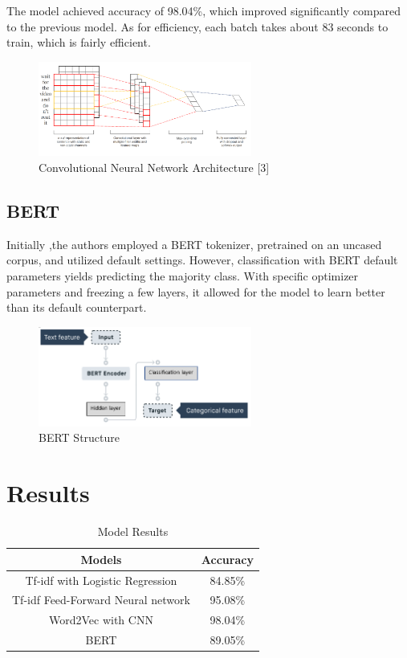 \documentclass[conference]{IEEEtran}
\begin{document}
The model achieved accuracy of 98.04\%, which improved significantly compared to the previous model. As for efficiency, each batch takes about 83 seconds to train, which is fairly efficient.

\begin{figure}[htbp]
\centerline{\includegraphics[width=70mm]{fig2.png}}
\caption{Convolutional Neural Network Architecture [3]}
\label{fig}
\end{figure}

\subsection{BERT}

Initially ,the authors employed a BERT tokenizer, pretrained on an uncased corpus, and utilized default settings. However, classification with BERT default parameters yields predicting the majority class. With specific optimizer parameters and freezing a few layers, it allowed for the model to learn better than its default counterpart.

\begin{figure}[htbp]
\centerline{\includegraphics[width=70mm]{fig3.png}}
\caption{BERT Structure}
\label{fig}
\end{figure}

\section{Results}

\begin{table}[htbp]
\caption{Model Results}
\begin{center}
\begin{tabular}{|c|l|l|l|l|l|l|c|l|l|}
\hline
\multicolumn{7}{|c|}{\textbf{Models}}    & \multicolumn{3}{c|}{\textbf{Accuracy}} \\ \hline
\multicolumn{7}{|c|}{Tf-idf with Logistic Regression}  & \multicolumn{3}{c|}{84.85\%}     \\ \hline
\multicolumn{7}{|c|}{Tf-idf Feed-Forward Neural network} & \multicolumn{3}{c|}{95.08\%}     \\ \hline
\multicolumn{7}{|c|}{Word2Vec with CNN}   & \multicolumn{3}{c|}{98.04\%}     \\ \hline
\multicolumn{7}{|c|}{BERT}      & \multicolumn{3}{c|}{89.05\%}     \\ \hline
\end{tabular}
\label{tab1}
\end{center}
\end{table}
\end{document}
